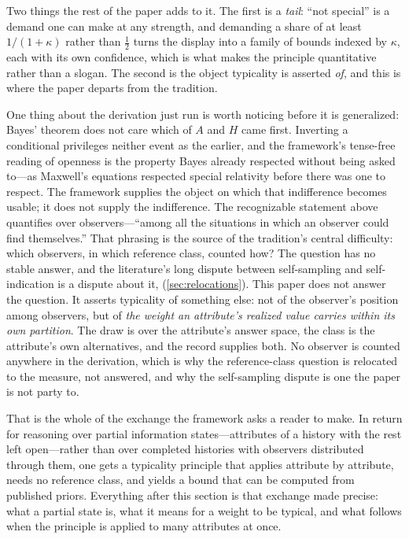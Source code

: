Two things the rest of the paper adds to it. The first is a \emph{tail}: ``not special'' is a demand one can make at any strength, and demanding a share of at least $1/(1+\kappa)$ rather than $\tfrac12$ turns the display into a family of bounds indexed by $\kappa$, each with its own confidence, which is what makes the principle quantitative rather than a slogan. The second is the object typicality is asserted \emph{of}, and this is where the paper departs from the tradition.

One thing about the derivation just run is worth noticing before it is generalized: Bayes' theorem does not care which of $A$ and $H$ came first. Inverting a conditional privileges neither event as the earlier, and the framework's tense-free reading of openness is the property Bayes already respected without being asked to---as Maxwell's equations respected special relativity before there was one to respect. The framework supplies the object on which that indifference becomes usable; it does not supply the indifference. The recognizable statement above quantifies over observers---``among all the situations in which an observer could find themselves.'' That phrasing is the source of the tradition's central difficulty: which observers, in which reference class, counted how? The question has no stable answer, and the literature's long dispute between self-sampling and self-indication is a dispute about it, (\autoref{sec:relocations}). This paper does not answer the question. It asserts typicality of something else: not of the observer's position among observers, but of \emph{the weight an attribute's realized value carries within its own partition}. The draw is over the attribute's answer space, the class is the attribute's own alternatives, and the record supplies both. No observer is counted anywhere in the derivation, which is why the reference-class question is relocated to the measure, not answered, and why the self-sampling dispute is one the paper is not party to.

That is the whole of the exchange the framework asks a reader to make. In return for reasoning over partial information states---attributes of a history with the rest left open---rather than over completed histories with observers distributed through them, one gets a typicality principle that applies attribute by attribute, needs no reference class, and yields a bound that can be computed from published priors. Everything after this section is that exchange made precise: what a partial state is, what it means for a weight to be typical, and what follows when the principle is applied to many attributes at once.


